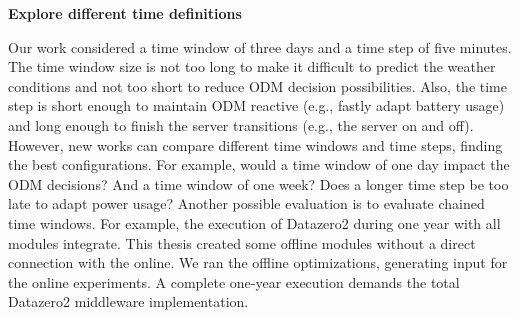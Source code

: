 \textbf{Explore different time definitions}

Our work considered a time window of three days and a time step of five minutes. The time window size is not too long to make it difficult to predict the weather conditions and not too short to reduce ODM decision possibilities. Also, the time step is short enough to maintain ODM reactive (e.g., fastly adapt battery usage) and long enough to finish the server transitions (e.g., the server on and off). However, new works can compare different time windows and time steps, finding the best configurations. For example, would a time window of one day impact the ODM decisions? And a time window of one week? Does a longer time step be too late to adapt power usage? Another possible evaluation is to evaluate chained time windows. For example, the execution of Datazero2 during one year with all modules integrate. This thesis created some offline modules without a direct connection with the online. We ran the offline optimizations, generating input for the online experiments. A complete one-year execution demands the total Datazero2 middleware implementation. 